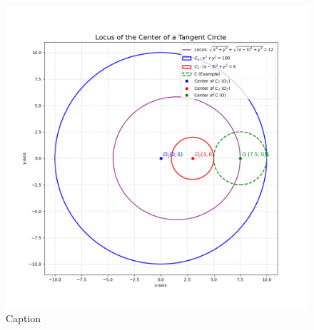 \documentclass[journal,12pt,onecolumn]{IEEEtran}
\theoremstyle{remark}
\begin{document}
\begin{figure}[H]
    \centering
    \includegraphics[width=0.7\columnwidth]{figs/1.png}
    \caption{Caption}
    \label{fig:placeholder}
\end{figure}
\end{document}
